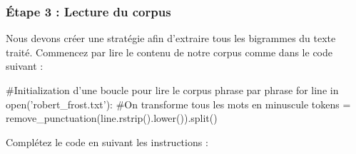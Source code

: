 \subsubsection{Étape 3 : Lecture du corpus}

Nous devons créer une stratégie afin d'extraire tous les bigrammes du texte traité. Commencez par lire le contenu de notre corpus comme dans le code suivant :

\begin{python}
#Initialization d'une boucle pour lire le corpus phrase par phrase
for line in open('robert_frost.txt'):
 #On transforme tous les mots en minuscule
 tokens = remove_punctuation(line.rstrip().lower()).split()
 
\end{python}

Complétez le code en suivant les instructions :

